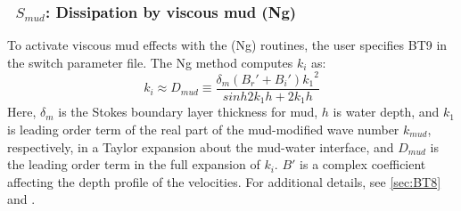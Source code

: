 \vsssub
\subsubsection{~$S_{mud}$: Dissipation by viscous mud (Ng)} \label{sec:BT9}
\vsssub


\noindent
To activate viscous mud effects with the (Ng) routines, the user specifies
{\code BT9} in the switch parameter file. The Ng method computes $k_i$ as:
\begin{equation}\label{eq:dmud3}
  k_i \approx {D_{mud}} \equiv \frac{\delta_m({B_r'}+{B_i'}){k_1}^2}{sinh2{k_1}{h}+2{k_1}{h}}
\end{equation}
Here, ${\delta_m}$ is the Stokes boundary layer thickness for mud, ${h}$ is
water depth, and ${k_1}$ is leading order term of the real part of the
mud-modified wave number $k_{mud}$, respectively, in a Taylor expansion about
the mud-water interface, and ${D_{mud}}$ is the leading order term in the full
expansion of $k_i$. $B'$ is a complex coefficient affecting the depth profile
of the velocities.  For additional details, see \para\ref{sec:BT8} and
\cite{art:Ng00}.
